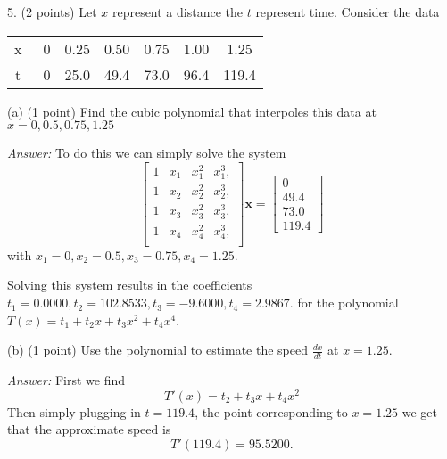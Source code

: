 \documentclass{article}
\newenvironment{answer}{\textit{Answer:}}{}
\begin{document}
5. (2 points) Let $x$ represent a distance the $t$ represent time. Consider the
data %
\begin{center}
    \begin{tabular}{c c c c c c c}
        x & \vline  \ 0 & 0.25 & 0.50 & 0.75 & 1.00 & 1.25  \\
        t & \vline \ 0  & 25.0 & 49.4 & 73.0 & 96.4 & 119.4
    \end{tabular}
\end{center}
(a) (1 point) Find the cubic polynomial that interpoles this data at\\
${x = 0, 0.5, 0.75, 1.25}$

\begin{answer}
    To do this we can simply solve the system
    \begin{equation*}
        \begin{bmatrix}
            1 & x_1 & x_1^2 & x_1^3, \\
            1 & x_2 & x_2^2 & x_2^3, \\
            1 & x_3 & x_3^2 & x_3^3, \\
            1 & x_4 & x_4^2 & x_4^3, \\
        \end{bmatrix}\bm{x} =
        \begin{bmatrix}
            0 \\ 49.4 \\ 73.0 \\ 119.4
        \end{bmatrix}
    \end{equation*}
    with $x_1 = 0, x_2 = 0.5, x_3 = 0.75, x_4 = 1.25$.

    Solving this system results in the coefficients
    $t_1 = 0.0000, t_2 = 102.8533, t_3 = -9.6000, t_4=2.9867$.
    for the polynomial $T(x) = t_1 + t_2 x + t_3x^2 + t_4x^4$.
\end{answer}

(b) (1 point) Use the polynomial to estimate the speed $\frac{dx}{dt}$ at
$x = 1.25$.

\begin{answer}
    First we find
    \begin{equation*}
        T'(x) = t_2 + t_3x + t_4x^2
    \end{equation*}
    Then simply plugging in $t=119.4$, the point corresponding to $x=1.25$
    we get that the approximate speed is
    \begin{equation*}
        T'(119.4) = 95.5200.
    \end{equation*}
\end{answer}
\end{document}

